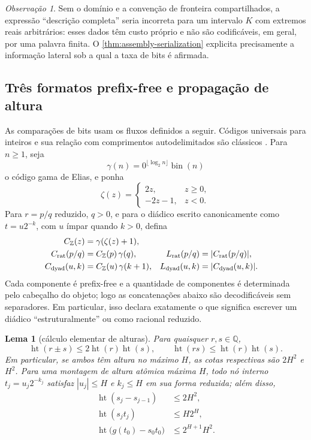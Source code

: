 \documentclass[11pt,a4paper]{article}
\newtheorem{lemma}[theorem]{Lema}
\theoremstyle{definition}
\theoremstyle{remark}
\newtheorem{remark}[theorem]{Observação}
\newcommand{\height}{\operatorname{ht}}
\begin{document}
\begin{remark}
Sem o domínio e a convenção de fronteira compartilhados, a expressão
``descrição completa'' seria incorreta para um intervalo $K$ com extremos
reais arbitrários: esses dados têm custo próprio e não são codificáveis, em
geral, por uma palavra finita. O \cref{thm:assembly-serialization} explicita
precisamente a informação lateral sob a qual a taxa de bits é afirmada.
\end{remark}

\subsection{Três formatos prefix-free e propagação de altura}
\label{subsec:coding-formats}

As comparações de bits usam os fluxos definidos a seguir. Códigos universais para inteiros e sua relação
com comprimentos autodelimitados são clássicos
\citep{elias1975,coverthomas2006}. Para $n\ge1$, seja
\[
 \gamma(n)=0^{\lfloor\log_2n\rfloor}\operatorname{bin}(n)
\]
o código gama de Elias, e ponha
\[
 \zeta(z)=\begin{cases}2z,&z\ge0,\\-2z-1,&z<0.
 \end{cases}
\]
Para $r=p/q$ reduzido, $q>0$, e para o diádico escrito canonicamente como
$t=u2^{-k}$, com $u$ ímpar quando $k>0$, defina
\begin{align}
 C_{\mathbb Z}(z)&=\gamma(\zeta(z)+1),\\
 C_{\rm rat}(p/q)&=C_{\mathbb Z}(p)\,\gamma(q),
 &L_{\rm rat}(p/q)&=|C_{\rm rat}(p/q)|,\label{eq:rational-code}\\
 C_{\rm dyad}(u,k)&=C_{\mathbb Z}(u)\,\gamma(k+1),
 &L_{\rm dyad}(u,k)&=|C_{\rm dyad}(u,k)|.
 \label{eq:dyadic-code}
\end{align}
Cada componente é prefix-free e a quantidade de componentes é determinada
pelo cabeçalho do objeto; logo as concatenações abaixo são decodificáveis sem
separadores. Em particular, isso declara exatamente o que significa escrever
um diádico ``estruturalmente'' ou como racional reduzido.

\begin{lemma}[cálculo elementar de alturas]
\label{lem:height-arithmetic}
Para quaisquer $r,s\in\mathbb Q$,
\begin{equation}
 \height(r\pm s)\le2\height(r)\height(s),
 \qquad
 \height(rs)\le\height(r)\height(s).
 \label{eq:height-arithmetic}
\end{equation}
Em particular, se ambos têm altura no máximo $H$, as cotas respectivas são
$2H^2$ e $H^2$.
Para uma montagem de altura atômica máxima $H$, todo nó interno
$t_j=u_j2^{-k_j}$ satisfaz $|u_j|\le H$ e $k_j\le H$ em sua forma reduzida;
além disso,
\begin{align}
 \height(s_j-s_{j-1})&\le2H^2,\label{eq:slope-jump-height}\\
 \height(s_jt_j)&\le H2^H,\label{eq:slope-knot-height}\\
 \height\bigl(g(t_0)-s_0t_0\bigr)&\le2^{H+1}H^2.
 \label{eq:intercept-height}
\end{align}
\end{lemma}
\end{document}
